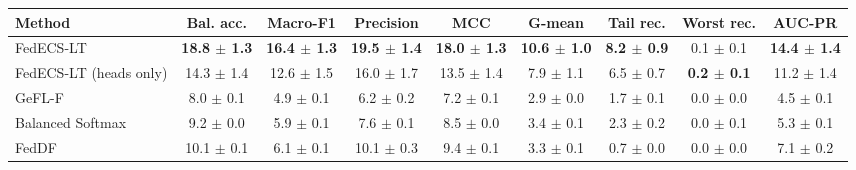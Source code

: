 \begin{tabular}{lcccccccc}
\toprule
Method & Bal. acc. & Macro-F1 & Precision & MCC & G-mean & Tail rec. & Worst rec. & AUC-PR\\
\midrule
FedECS-LT & \textbf{18.8 $\pm$ 1.3} & \textbf{16.4 $\pm$ 1.3} & \textbf{19.5 $\pm$ 1.4} & \textbf{18.0 $\pm$ 1.3} & \textbf{10.6 $\pm$ 1.0} & \textbf{8.2 $\pm$ 0.9} & 0.1 $\pm$ 0.1 & \textbf{14.4 $\pm$ 1.4}\\
FedECS-LT (heads only) & 14.3 $\pm$ 1.4 & 12.6 $\pm$ 1.5 & 16.0 $\pm$ 1.7 & 13.5 $\pm$ 1.4 & 7.9 $\pm$ 1.1 & 6.5 $\pm$ 0.7 & \textbf{0.2 $\pm$ 0.1} & 11.2 $\pm$ 1.4\\
GeFL-F & 8.0 $\pm$ 0.1 & 4.9 $\pm$ 0.1 & 6.2 $\pm$ 0.2 & 7.2 $\pm$ 0.1 & 2.9 $\pm$ 0.0 & 1.7 $\pm$ 0.1 & 0.0 $\pm$ 0.0 & 4.5 $\pm$ 0.1\\
Balanced Softmax & 9.2 $\pm$ 0.0 & 5.9 $\pm$ 0.1 & 7.6 $\pm$ 0.1 & 8.5 $\pm$ 0.0 & 3.4 $\pm$ 0.1 & 2.3 $\pm$ 0.2 & 0.0 $\pm$ 0.1 & 5.3 $\pm$ 0.1\\
FedDF & 10.1 $\pm$ 0.1 & 6.1 $\pm$ 0.1 & 10.1 $\pm$ 0.3 & 9.4 $\pm$ 0.1 & 3.3 $\pm$ 0.1 & 0.7 $\pm$ 0.0 & 0.0 $\pm$ 0.0 & 7.1 $\pm$ 0.2\\
\bottomrule
\end{tabular}
